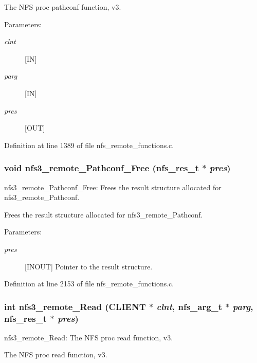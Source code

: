 The NFS proc pathconf function, v3.

\begin{Desc}
\item[Parameters:]
\begin{description}
\item[{\em clnt}][IN] \item[{\em parg}][IN] \item[{\em pres}][OUT] \end{description}
\end{Desc}


Definition at line 1389 of file nfs\_\-remote\_\-functions.c.
\subsubsection{\setlength{\rightskip}{0pt plus 5cm}void nfs3\_\-remote\_\-Pathconf\_\-Free (nfs\_\-res\_\-t $\ast$ {\em pres})}\label{group__NFSprocs_ga91}


nfs3\_\-remote\_\-Pathconf\_\-Free: Frees the result structure allocated for nfs3\_\-remote\_\-Pathconf.

Frees the result structure allocated for nfs3\_\-remote\_\-Pathconf.

\begin{Desc}
\item[Parameters:]
\begin{description}
\item[{\em pres}][INOUT] Pointer to the result structure. \end{description}
\end{Desc}


Definition at line 2153 of file nfs\_\-remote\_\-functions.c.
\subsubsection{\setlength{\rightskip}{0pt plus 5cm}int nfs3\_\-remote\_\-Read (CLIENT $\ast$ {\em clnt}, nfs\_\-arg\_\-t $\ast$ {\em parg}, nfs\_\-res\_\-t $\ast$ {\em pres})}\label{group__NFSprocs_ga23}


nfs3\_\-remote\_\-Read: The NFS proc read function, v3.

The NFS proc read function, v3.

